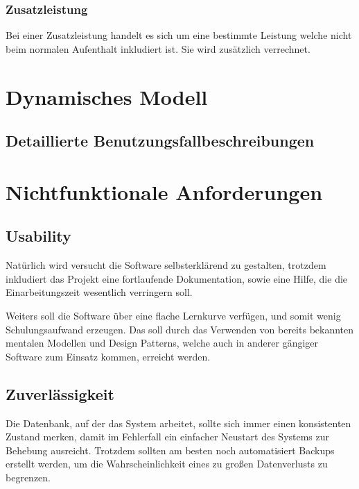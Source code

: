 \documentclass[10pt,a4paper,titlepage]{article}
\begin{document}
\subsubsection{Zusatzleistung}
Bei einer Zusatzleistung handelt es sich um eine bestimmte Leistung welche nicht
beim normalen Aufenthalt inkludiert ist. Sie wird zusätzlich verrechnet.

\newpage

\section{Dynamisches Modell}
\subsection{Detaillierte Benutzungsfallbeschreibungen}















\newpage

\section{Nichtfunktionale Anforderungen}
\subsection{Usability}
Natürlich wird versucht die Software selbsterklärend zu gestalten, trotzdem inkludiert das Projekt eine fortlaufende Dokumentation, sowie eine Hilfe, die die Einarbeitungszeit wesentlich verringern soll.

Weiters soll die Software über eine flache Lernkurve verfügen, und somit wenig Schulungsaufwand erzeugen. Das soll durch das Verwenden von bereits bekannten mentalen Modellen und Design Patterns, welche auch in anderer gängiger Software zum Einsatz kommen, erreicht werden.
\subsection{Zuverlässigkeit}
Die Datenbank, auf der das System arbeitet, sollte sich immer einen konsistenten Zustand merken, damit im Fehlerfall ein einfacher Neustart des Systems zur Behebung ausreicht. Trotzdem sollten am besten noch automatisiert Backups erstellt werden, um die Wahrscheinlichkeit eines zu großen Datenverlusts zu begrenzen.
\end{document}
